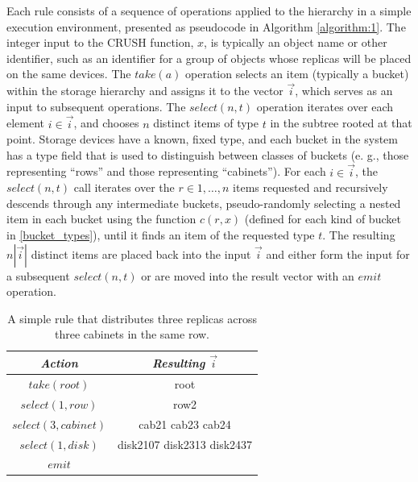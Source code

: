 \documentclass[12pt,a4paper]{report}
\begin{document}
Each rule consists of a sequence of operations applied to the hierarchy in a
simple execution environment, presented as pseudocode in Algorithm \ref{algorithm:1}. The
integer input to the CRUSH function, $x$, is typically an object name or other
identifier, such as an identifier for a group of objects whose replicas will be
placed on the same devices. The $take(a)$ operation selects an item (typically
a bucket) within the storage hierarchy and assigns it to the vector $\vec{i}$,
which serves as an input to subsequent operations. The $select(n,t)$ operation
iterates over each element $i \in \vec{i}$, and chooses $n$ distinct items of
type $t$ in the subtree rooted at that point. Storage devices have a known,
fixed type, and each bucket in the system has a type field that is used to
distinguish between classes of buckets (e. g., those representing ``rows'' and
those representing ``cabinets'').  For each $i \in \vec{i}$, the $select(n,t)$
call iterates over the $r \in 1,\dots,n$ items requested  and  recursively
descends through any intermediate buckets, pseudo-randomly selecting a nested
item in each bucket using the function $c(r,x)$ (defined for each kind of
bucket in \ref{bucket_types}), until it finds an item of the requested type
$t$. The resulting $n|\vec{i}|$ distinct items are placed back into the input
$\vec{i}$ and either form the input for a subsequent $select(n,t)$ or are moved
into the result vector with an $emit$ operation.

\begin{table}[h!]
\centering
\begin{tabular}{ |c|c| }
	\hline
	\emph{Action} & \emph{Resulting $\vec{i}$} \\
	\hline
	$take(root)$ & root \\
	$select(1,row)$ & row2 \\
	$select(3,cabinet)$ & cab21 cab23 cab24 \\
	$select(1,disk)$ & disk2107 disk2313 disk2437 \\
	$emit$ & \\
	\hline
\end{tabular}
\caption{A simple rule that distributes three replicas across three cabinets in the same row.}
\label{table:1}
\end{table}
\end{document}
